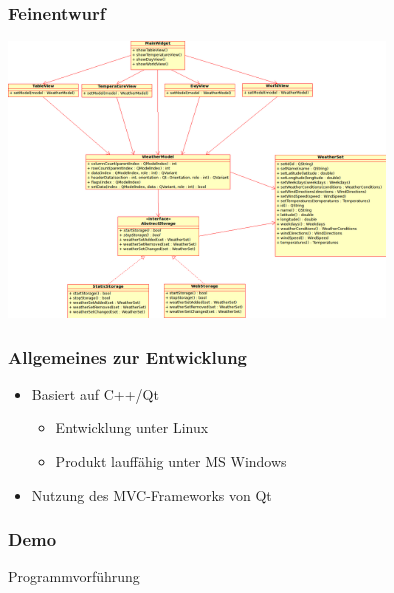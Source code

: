 \begin{frame}
    \frametitle{Feinentwurf}
    \begin{center}
        \includegraphics[width=10cm]{../design/feinentwurf.png}
    \end{center}
\end{frame}
\begin{frame}
    \frametitle{Allgemeines zur Entwicklung}
    \begin{itemize}
        \item Basiert auf C++/Qt
        \begin{itemize}
          \item Entwicklung unter Linux
          \item Produkt lauff\"ahig unter MS Windows
        \end{itemize}
        \item Nutzung des MVC-Frameworks von Qt
    \end{itemize}
\end{frame}

%
%
%
%
%

\begin{frame}
    \frametitle{Demo}
    \begin{center}
        \large{Programmvorf\"uhrung}
    \end{center}
\end{frame}
